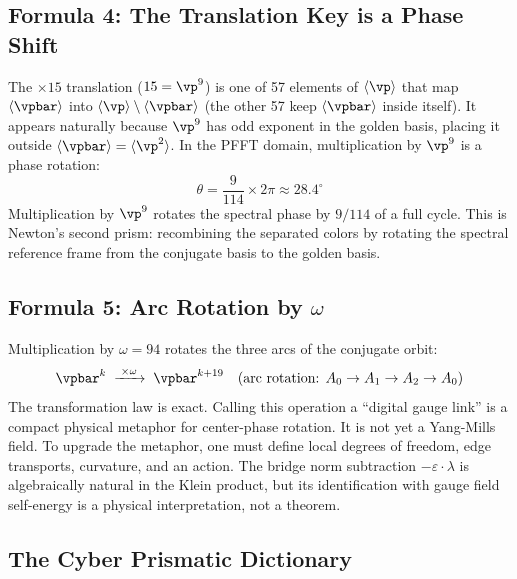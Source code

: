 \subsection{Formula 4: The Translation Key is a Phase Shift}

The $\times 15$ translation ($15 = \vp^9$) is one of 57 elements of $\langle \vp \rangle$ that map $\langle \vpbar \rangle$ into $\langle \vp \rangle \setminus \langle \vpbar \rangle$ (the other 57 keep $\langle \vpbar \rangle$ inside itself). It appears naturally because $\vp^9$ has odd exponent in the golden basis, placing it outside $\langle \vpbar \rangle = \langle \vp^2 \rangle$. In the PFFT domain, multiplication by $\vp^9$ is a phase rotation:
\begin{equation}\label{eq:phase_shift}
\theta = \frac{9}{114} \times 2\pi \approx 28.4^\circ
\end{equation}
Multiplication by $\vp^9$ rotates the spectral phase by $9/114$ of a full cycle. This is Newton's second prism: recombining the separated colors by rotating the spectral reference frame from the conjugate basis to the golden basis.

\subsection{Formula 5: Arc Rotation by $\omega$}

Multiplication by $\omega = 94$ rotates the three arcs of the conjugate orbit:
\[
\vpbar^k \;\xrightarrow{\;\times\omega\;}\; \vpbar^{k+19} \quad \text{(arc rotation: } A_0 \to A_1 \to A_2 \to A_0\text{)}
\]
The transformation law is exact. Calling this operation a ``digital gauge link'' is a compact physical metaphor for center-phase rotation. It is not yet a Yang-Mills field. To upgrade the metaphor, one must define local degrees of freedom, edge transports, curvature, and an action. The bridge norm subtraction $-\varepsilon \cdot \lambda$ is algebraically natural in the Klein product, but its identification with gauge field self-energy is a physical interpretation, not a theorem.

\subsection{The Cyber Prismatic Dictionary}

